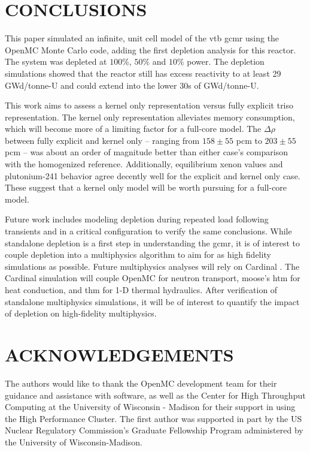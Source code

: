 \documentclass[letterpaper]{physor2024}
\begin{document}
\section{CONCLUSIONS}\label{sec:conclusions}
This paper simulated an infinite, unit cell model of the \gls{vtb} \gls{gcmr} using the OpenMC Monte Carlo code, adding the first depletion analysis for this reactor. The system was depleted at $100\%$, $50\%$ and $10\%$ power. The depletion simulations showed that the reactor still has excess reactivity to at least 29 GWd/tonne-U and could extend into the lower 30s of GWd/tonne-U.

This work aims to assess a kernel only representation versus fully explicit \gls{triso} representation. The kernel only representation alleviates memory consumption, which will become more of a limiting factor for a full-core model. The $\Delta \rho$ between fully explicit and kernel only -- ranging from $158\pm55$ \gls{pcm} to $203\pm55$ \gls{pcm} -- was about an order of magnitude better than either case's comparison with the homogenized reference. Additionally, equilibrium xenon values and plutonium-241 behavior agree decently well for the explicit and kernel only case. These suggest that a kernel only model will be worth pursuing for a full-core model.

Future work includes modeling depletion during repeated load following transients and in a critical configuration to verify the same conclusions. While standalone depletion is a first step in understanding the \gls{gcmr}, it is of interest to couple depletion into a multiphysics algorithm to aim for as high fidelity simulations as possible. Future multiphysics analyses will rely on Cardinal \cite{novak2022-cardinal}. The Cardinal simulation will couple OpenMC for neutron transport, \gls{moose}'s \gls{htm} for heat conduction, and \gls{thm} for 1-D thermal hydraulics. After verification of standalone multiphysics simulations, it will be of interest to quantify the impact of depletion on high-fidelity multiphysics.

\section*{ACKNOWLEDGEMENTS}
The authors would like to thank the OpenMC development team for their guidance and assistance with software, as well as the Center for High Throughput Computing at the University of Wisconsin - Madison for their support in using the High Performance Cluster. The first author was supported in part by the US Nuclear Regulatory Commission's Graduate Fellowship Program administered by the University of Wisconsin-Madison.




\end{document}
